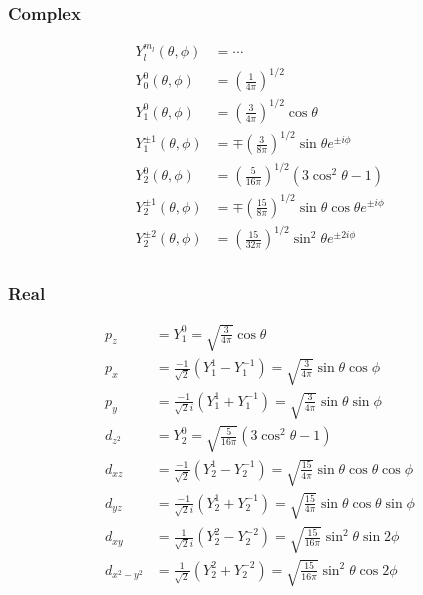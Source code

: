 \subsubsection{Complex}
\begin{align*}
Y_l^{m_l}\left(\theta,\phi\right)&=\cdots\\
Y_0^0\left(\theta,\phi\right)&=\left(\frac{1}{4\pi}\right)^{1/2}\\
Y_1^0\left(\theta,\phi\right)&=\left(\frac{3}{4\pi}\right)^{1/2}\cos\theta\\
Y_1^{\pm 1}\left(\theta,\phi\right)&=\mp\left(\frac{3}{8\pi}\right)^{1/2}\sin\theta e^{\pm i \phi}\\
Y_2^0\left(\theta,\phi\right)&=\left(\frac{5}{16\pi}\right)^{1/2}\left(3\cos ^2 \theta -1 \right)\\
Y_2^{\pm 1}\left(\theta,\phi\right)&=\mp\left(\frac{15}{8\pi}\right)^{1/2}\sin\theta \cos\theta e^{\pm i \phi}\\
Y_2^{\pm 2}\left(\theta,\phi\right)&=\left(\frac{15}{32\pi}\right)^{1/2}\sin^2\theta e^{\pm 2i \phi}\\
\end{align*}
\subsubsection{Real}
\begin{align*}
p_z &= Y_1^0=\sqrt{\frac{3}{4\pi}}\cos\theta\\
p_x&=\frac{-1}{\sqrt{2}}\left( Y_1^1-Y_1^{-1}\right)= \sqrt{\frac{3}{4\pi}}\sin \theta\cos\phi\\
p_y&=\frac{-1}{\sqrt{2}i}\left( Y_1^1+Y_1^{-1}\right)= \sqrt{\frac{3}{4\pi}}\sin \theta\sin\phi\\
d_{z^2}&=Y_2^0=\sqrt{\frac{5}{16\pi}}\left(3\cos ^2 \theta -1 \right)\\
d_{xz}&=\frac{-1}{\sqrt{2}}\left( Y_2^1-Y_2^{-1}\right)=\sqrt{\frac{15}{4\pi}}\sin \theta\cos\theta\cos\phi\\
d_{yz}&=\frac{-1}{\sqrt{2}i}\left( Y_2^1+Y_2^{-1}\right)=\sqrt{\frac{15}{4\pi}}\sin \theta\cos\theta\sin\phi\\
d_{xy}&=\frac{1}{\sqrt{2}i}\left( Y_2^2-Y_2^{-2}\right)=\sqrt{\frac{15}{16\pi}}\sin^2\theta\sin 2\phi\\
d_{x^2-y^2}&=\frac{1}{\sqrt{2}}\left( Y_2^2+Y_2^{-2}\right)=\sqrt{\frac{15}{16\pi}}\sin^2\theta\cos 2\phi\\
\end{align*}
